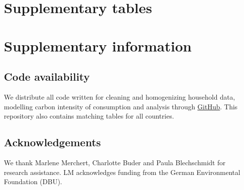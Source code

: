 \documentclass[12pt, a4paper]{article}
\begin{document}
\clearpage

\section{Supplementary tables} \label{sec:tables}


\clearpage


\clearpage


\clearpage


\clearpage


\clearpage


\clearpage


\clearpage

%   



\clearpage


\clearpage


\clearpage


\clearpage


\clearpage

\section{Supplementary information}
\subsection{Code availability}
We distribute all code written for cleaning and homogenizing household data, modelling carbon intensity of consumption and analysis through \href{https://github.com/lmissbach/Carbon-Intensity-2023}{GitHub}. This repository also contains matching tables for all countries.

\subsection{Acknowledgements}

We thank Marlene Merchert, Charlotte Buder and Paula Blechschmidt for research assistance. LM acknowledges funding from the German Environmental Foundation (DBU).
\end{document}
